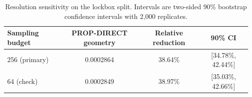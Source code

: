 \begin{table}[tb]
  \centering
  \caption{Resolution sensitivity on the lockbox split. Intervals are
  two-sided 90\% bootstrap confidence intervals with 2,000 replicates.}
  \label{tab:c1_resolution}
  \begin{tabular}{lccc}
    \toprule
    Sampling budget & PROP-DIRECT geometry & Relative reduction & 90\% CI \\
    \midrule
    256 (primary) & 0.0002864 & 38.64\% & [34.78\%, 42.44\%] \\
    64 (check)    & 0.0002849 & 38.97\% & [35.03\%, 42.66\%] \\
    \bottomrule
  \end{tabular}
\end{table}
